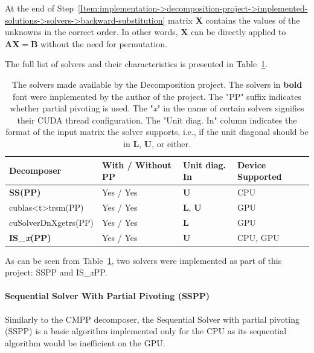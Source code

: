 At the end of Step~\ref{Item:implementation->decomposition-project->implemented-solutions->solvers->backward-substitution} matrix $\mathbf{X}$ contains the values of the unknowns in the correct order. In other words, $\mathbf{X}$ can be directly applied to $\mathbf{AX} = \mathbf{B}$ without the need for permutation.

The full list of solvers and their characteristics is presented in Table~\ref{Table:implementation->decomposition-project->implemented-solutions->solvers->solvers-in-the-project}.

\begin{table}[!ht]
	\centering
	\begin{tabular}{|l|l|l|l|}
		\hline
		Decomposer                 & With / Without PP & Unit diag. In 				 & Device Supported \\ \hline
		\textbf{SS(PP)}  		   & Yes / Yes         & $\mathbf{U}$  				 & CPU              \\
		cublas<t>trsm(PP)	   	   & Yes / Yes         & $\mathbf{L}$, $\mathbf{U}$  & GPU              \\
		cuSolverDnXgetrs(PP)	   & Yes / Yes         & $\mathbf{L}$				 & GPU              \\
		\textbf{IS\_\textit{x}(PP)}  & Yes / Yes         & $\mathbf{U}$				 & CPU, GPU         \\ \hline
	\end{tabular}
	\caption{The solvers made available by the Decomposition project. The solvers in \textbf{bold} font were implemented by the author of the project. The "PP" suffix indicates whether partial pivoting is used. The "\textit{x}" in the name of certain solvers signifies their CUDA thread configuration. The "Unit diag. In" column indicates the format of the input matrix the solver supports, i.e., if the unit diagonal should be in $\mathbf{L}$, $\mathbf{U}$, or either.}
	\label{Table:implementation->decomposition-project->implemented-solutions->solvers->solvers-in-the-project}
\end{table}

As can be seen from Table~\ref{Table:implementation->decomposition-project->implemented-solutions->solvers->solvers-in-the-project}, two solvers were implemented as part of this project: SSPP and IS\_\textit{x}PP.

\paragraph{Sequential Solver With Partial Pivoting (SSPP)} Similarly to the CMPP decomposer, the Sequential Solver with partial pivoting (SSPP) is a basic algorithm implemented only for the CPU as its sequential algorithm would be inefficient on the GPU.

